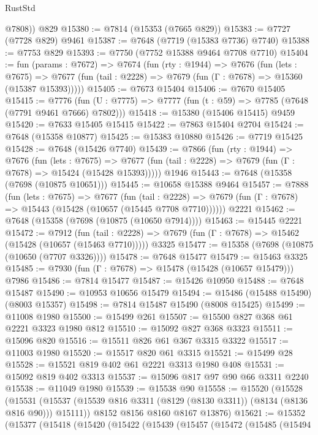 \begin{lexlean}{RustStd}
\begin{coremodule}
{\begin{coremodule}
{{{{{{{{{{{{{{{{{{{{{{{{{{{{{{{{{{{{{{{{{{{{{{{{{{{{{        @7808))
    @829
@15380 := @7814 (@15353 (@7665 @829))
@15383 := @7727 (@7728 @829) @9461
@15387 := @7648 (@7719 (@15383 @7736) @7740)
@15388 := @7753 @829
@15393 := @7750 (@7752 @15388 @9464 @7708 @7710)
@15404 := fun (params : @7672) =>
  @7674
    (fun (rty : @1944) =>
    @7676
      (fun (lets : @7675) =>
      @7677 (fun (tail : @2228) => @7679 (fun (Γ : @7678) => @15360 (@15387 @15393)))))
@15405 := @7673 @15404
@15406 := @7670 @15405
@15415 := @7776
    (fun (U : @7775) => @7777 (fun (t : @59) => @7785 (@7648 (@7791 @9461 @7666) @7802)))
@15418 := @15380 (@15406 @15415) @9459
@15420 := @7633 @15405 @15415
@15422 := @7863 @15404 @2704
@15424 := @7648 (@15358 @10877)
@15425 := @15383 @10880
@15426 := @7719 @15425
@15428 := @7648 (@15426 @7740)
@15439 := @7866
    (fun (rty : @1944) =>
    @7676
      (fun (lets : @7675) =>
      @7677 (fun (tail : @2228) => @7679 (fun (Γ : @7678) => @15424 (@15428 @15393)))))
    @1946
@15443 := @7648 (@15358 (@7698 (@10875 @10651)))
@15445 := @10658 @15388 @9464
@15457 := @7888
    (fun (lets : @7675) =>
    @7677
      (fun (tail : @2228) =>
      @7679 (fun (Γ : @7678) => @15443 (@15428 (@10657 (@15445 @7708 @7710))))))
    @2221
@15462 := @7648 (@15358 (@7698 (@10875 (@10650 @7914))))
@15463 := @15445 @2221
@15472 := @7912
    (fun (tail : @2228) => @7679 (fun (Γ : @7678) => @15462 (@15428 (@10657 (@15463 @7710)))))
    @3325
@15477 := @15358 (@7698 (@10875 (@10650 (@7707 @3326))))
@15478 := @7648 @15477
@15479 := @15463 @3325
@15485 := @7930 (fun (Γ : @7678) => @15478 (@15428 (@10657 @15479))) @7986
@15486 := @7814 @15477
@15487 := @15426 @10950
@15488 := @7648 @15487
@15490 := @10953 @10656 @15479
@15494 := @15486 (@15488 @15490) (@8003 @15357)
@15498 := @7814 @15487 @15490 (@8008 @15425)
@15499 := @11008 @1980
@15500 := @15499 @261
@15507 := @15500 @827 @368 @61 @2221 @3323 @1980 @812
@15510 := @15092 @827 @368 @3323
@15511 := @15096 @820
@15516 := @15511 @826 @61 @367 @3315 @3322
@15517 := @11003 @1980
@15520 := @15517 @820 @61 @3315
@15521 := @15499 @28
@15528 := @15521 @819 @402 @61 @2221 @3313 @1980 @408
@15531 := @15092 @819 @402 @3313
@15537 := @15096 @817 @97 @90 @66 @3311 @2240
@15538 := @11049 @1980
@15539 := @15538 @90
@15558 := @15520
    (@15528
      (@15531 (@15537 (@15539 @816 @3311 (@8129 (@8130 @3311)) (@8134 (@8136 @816 @90))) @15111))
      @8152
      @8156
      @8160
      @8167
      @13876)
@15621 := @15352
    (@15377
      (@15418
        (@15420
          (@15422
            (@15439
              (@15457
                (@15472
                  (@15485
                    (@15494
}}}}}}}}}}}}}}}}}}}}}}}}}}}}}}}}}}}}}}}}}}}}}}}}}}}}}
\end{coremodule}}
\end{coremodule}
\end{lexlean}
